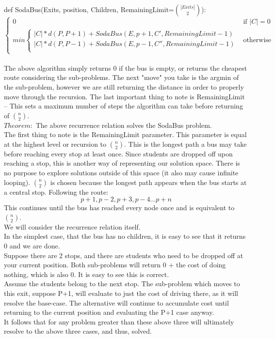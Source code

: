 \documentclass{article}
\begin{document}
\begin{enumerate}
def SodaBus(Exits, position, Children, RemainingLimit=$|Exits| \choose 2$):
    \[
        \begin{cases}
            0 & \text{if } |C| = 0\\
            min
            \begin{cases}
            |C| * d(P, P+1) + SodaBus(E, p+1, C', RemainingLimit - 1) \\
            |C| * d(P, P-1) + SodaBus(E, p-1, C'', RemainingLimit - 1)\\
            \end{cases} & \text{otherwise}
        \end{cases}
    \]
\\
The above algorithm simply returns 0 if the bus is empty, or returns the cheapest route considering the sub-problems. The next "move" you take is the argmin of the sub-problem, however we are still returning the distance in order to properly move through the recursion. The last important thing to note is RemainingLimit -- This sets a maximum number of steps the algorithm can take before returning of $n \choose 2$.\\

$Theorem:$ The above recurrence relation solves the SodaBus problem. \\
The first thing to note is the RemainingLimit parameter. This parameter is equal at the highest level or recursion to $n \choose 2$. This is the longest path a bus may take before reaching every stop at least once. Since students are dropped off upon reaching a stop, this is another way of representing our solution space. There is no purpose to explore solutions outside of this space (it also may cause infinite looping). $n \choose 2$ is chosen because the longest path appears when the bus starts at a central stop. Following the route: 
\[p+1, p-2, p+3, p-4 ... p+n\]
This continues until the bus has reached every node once and is equivalent to $n \choose 2$. \\

We will consider the recurrence relation itself.\\
In the simplest case, that the bus has no children, it is easy to see that it returns 0 and we are done.\\
Suppose there are 2 stops, and there are students who need to be dropped off at your current position. Both sub-problems will return 0 + the cost of doing nothing, which is also 0. It is easy to see this is correct.\\
Assume the students belong to the next stop. The sub-problem which moves to this exit, suppose P+1, will evaluate to just the cost of driving there, as it will resolve the base-case. The alternative will continue to accumulate cost until returning to the current position and evaluating the P+1 case anyway.\\
It follows that for any problem greater than these above three will ultimately resolve to the above three cases, and thus, solved.\\


\end{enumerate}
\end{document}
